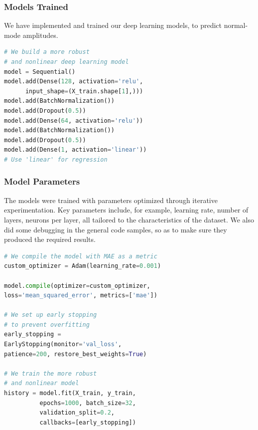 \documentclass[conference]{IEEEtran}
\begin{document}
\subsubsection{Models Trained}
We have implemented and trained our deep learning models, to predict normal-mode amplitudes\cite{drori2022science}\cite{articleI}.
\begin{lstlisting}[language=Python, caption=Deep Learning Model Training, label=code:deep-learning-model]
# We build a more robust 
# and nonlinear deep learning model
model = Sequential()
model.add(Dense(128, activation='relu', 
      input_shape=(X_train.shape[1],)))
model.add(BatchNormalization())
model.add(Dropout(0.5))
model.add(Dense(64, activation='relu'))
model.add(BatchNormalization())
model.add(Dropout(0.5))
model.add(Dense(1, activation='linear'))  
# Use 'linear' for regression
\end{lstlisting}

\subsubsection{Model Parameters}
The models were trained with parameters optimized through iterative experimentation. Key parameters include, for example, learning rate, number of layers, neurons per layer, all tailored to the characteristics of the dataset\cite{drori2022science}\cite{articleI}. We also did some debugging in the general code samples, so as to make sure they produced the required results.
\begin{lstlisting}[language=Python, caption = Model Parameters, label=code:model-training]
# We compile the model with MAE as a metric
custom_optimizer = Adam(learning_rate=0.001)

model.compile(optimizer=custom_optimizer, 
loss='mean_squared_error', metrics=['mae'])

# We set up early stopping 
# to prevent overfitting
early_stopping = 
EarlyStopping(monitor='val_loss', 
patience=200, restore_best_weights=True)

# We train the more robust 
# and nonlinear model
history = model.fit(X_train, y_train, 
          epochs=1000, batch_size=32,
          validation_split=0.2, 
          callbacks=[early_stopping])
\end{lstlisting}
\end{document}
